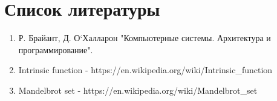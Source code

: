 \documentclass[a4paper, 12pt]{article}
\begin{document}
\raggedright
\section*{Список литературы}
\begin{enumerate}
    \item Р. Брайант, Д. О`Халларон "Компьютерные системы. Архитектура и программирование".
    \item Intrinsic function - https://en.wikipedia.org/wiki/Intrinsic\_function
    \item Mandelbrot set - https://en.wikipedia.org/wiki/Mandelbrot\_set
\end{enumerate}
\end{document}
